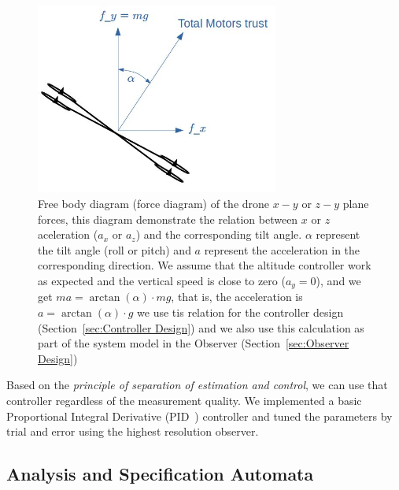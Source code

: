 \documentclass[ twoside, 12pt ]{article}
\begin{document}
\begin{figure} %
    \centerline{\includegraphics[width=80mm]{acceleration_static_diagram.jpg}}
    \caption{Free body diagram (force diagram) of the drone $x-y$ or $z-y$ plane forces, this diagram demonstrate the relation between $x$ or $z$ aceleration ($a_x$ or $a_z$) and the corresponding tilt angle. $\alpha$ represent the tilt angle (roll or pitch) and $a$ represent the acceleration in the corresponding direction. We assume that the altitude controller work as expected and the vertical speed is close to zero ($a_y = 0$), and we get $m a = \arctan(\alpha) \cdot mg$, that is, the acceleration is $a = \arctan(\alpha) \cdot g$ we use tis relation for the controller design (Section~\ref{sec:Controller Design}) and we also use this calculation as part of the system model in the Observer (Section~\ref{sec:Observer Design}) }
    \label{fig:acceleration_static_diagram}
\end{figure}

Based on the \textit{principle of separation of estimation and control}, we can use that controller regardless of the measurement quality. We implemented a basic Proportional Integral Derivative (PID~\cite{aastrom2006advanced}) controller and tuned the parameters by trial and error using the highest resolution observer.

\subsection{Analysis and Specification Automata}
\label{sec:Analysis}
\end{document}
